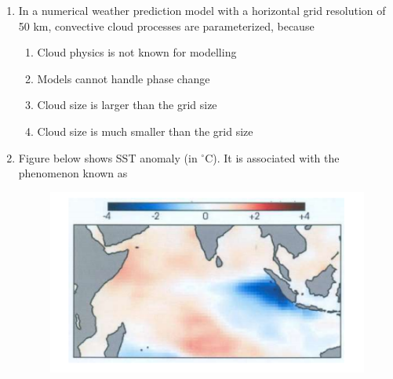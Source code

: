 \documentclass[a4paper,10pt]{article}
\begin{document}
\begin{enumerate}
    \item In a numerical weather prediction model with a horizontal grid resolution of 50 km, convective cloud processes are parameterized, because
    \hfill{}
    \begin{enumerate}[label=\Alph*)]
        \item Cloud physics is not known for modelling
        \item Models cannot handle phase change
        \item Cloud size is larger than the grid size
        \item Cloud size is much smaller than the grid size
    \end{enumerate}

    \item Figure below shows SST anomaly (in $^{\circ}$C). It is associated with the phenomenon known as
    \begin{figure}[H] \centering \includegraphics[width=0.7\columnwidth]{q9_atmos_2018.png} \caption*{} \label{fig:q9_atmos_2018} \end{figure}
    \hfill{}
    \begin{enumerate}[label=\Alph*)]
    \end{enumerate}


\end{enumerate}
\end{document}
